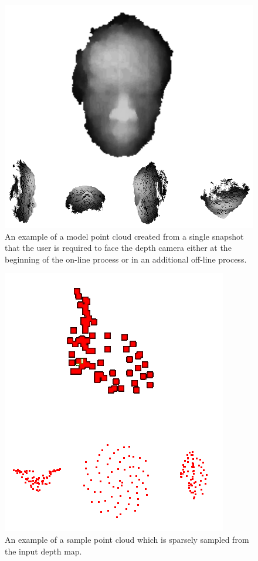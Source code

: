 \begin{figure}
\centering
\includegraphics[width=0.7\linewidth]{./figure/modelPointCloud.png}
\caption{An example of a model point cloud created from a single snapshot that the user is required to face the depth camera either at the beginning of the on-line process or in an additional off-line process. }
\label{f:modelPC}
\end{figure}

\begin{figure}
\centering
\includegraphics[width=0.5\linewidth]{./figure/samplePointCloud.png}
\caption{An example of a sample point cloud which is sparsely sampled from the input depth map.}
\label{f:samplePC}
\end{figure}

